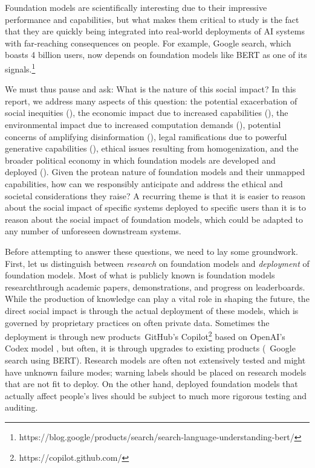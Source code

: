 Foundation models are scientifically interesting due to their impressive performance and capabilities, 
but what makes them critical to study is the fact that they are quickly being integrated into real-world deployments of AI systems with far-reaching consequences on people.
For example, Google search, which boasts 4 billion users,
now depends on foundation models like BERT \citep{devlin2019bert} as one of its
signals.\footnote{https://blog.google/products/search/search-language-understanding-bert/}

We must thus pause and ask:
What is the nature of this social impact?
In this report, we address many aspects of this question:
the potential exacerbation of social inequities (),
the economic impact due to increased capabilities (),
the environmental impact due to increased computation demands (),
potential concerns of amplifying disinformation (),
legal ramifications due to powerful generative capabilities (),
ethical issues resulting from homogenization,
and the broader political economy in which foundation models are developed and deployed ().
Given the protean nature of foundation models and their unmapped capabilities,
how can we responsibly anticipate and address the ethical and societal considerations they raise?
A recurring theme is that it is easier
to reason about the social impact of specific systems deployed to specific users
than it is to reason about the social impact of foundation models,
which could be adapted to any number of unforeseen downstream systems.

Before attempting to answer these questions,
we need to lay some groundwork.
First, let us distinguish between \emph{research} on foundation models and \emph{deployment} of foundation models.
Most of what is publicly known is foundation models research\dash{}through academic papers,
demonstrations, and progress on leaderboards.
While the production of knowledge can play a vital role in shaping the future,
the direct social impact is through the actual deployment of these models,
which is governed by proprietary practices on often private data.
Sometimes the deployment is through new products\dash{}\eg~GitHub's
Copilot\footnote{https://copilot.github.com/} based on OpenAI's Codex model
\citep{chen2021evaluating}, but often,
it is through upgrades to existing products (\eg~Google search using BERT).
Research models are often not extensively tested and might have unknown failure modes;
warning labels should be placed on research models that are not fit to deploy.
On the other hand, deployed foundation models that actually affect people's lives
should be subject to much more rigorous testing and auditing.

